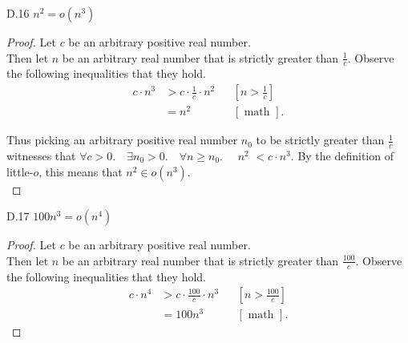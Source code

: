 \documentclass[10pt]{article}
\begin{document}
\begin{enumerate}[label={}]
            \newpage

            D.16 $n^2=o\left(n^3\right)$
            \begin{proof}
                  Let $c$ be an arbitrary positive real number.\\
                  Then let $n$ be an arbitrary real number that is strictly greater than $\frac{1}{c}$. Observe the following inequalities that they hold.\\
                  $$
                        \begin{aligned}
                              c \cdot n^3 & >c \cdot \frac{1}{c} \cdot n^2 &  & {\left[n>\frac{1}{c}\right] } \\
                                          & =n^2                           &  & {[\text { math }]. }
                        \end{aligned}
                  $$

                  Thus picking an arbitrary positive real number $n_0$ to be strictly greater than $\frac{1}{c}$ witnesses that $\forall c>0 . \quad \exists n_0>0 . \quad \forall n \geq n_0 . \quad$ $n^2$ $< c \cdot n^3$. By the definition of little-$o$, this means that $n^2 \in o\left(n^3\right)$.\\
            \end{proof}
            D.17 $100 n^3=o\left(n^4\right)$
            \begin{proof}
                  Let $c$ be an arbitrary positive real number.\\
                  Then let $n$ be an arbitrary real number that is strictly greater than $\frac{100}{c}$. Observe the following inequalities that they hold.\\
                  $$
                        \begin{aligned}
                              c \cdot n^4 & >c \cdot \frac{100}{c} \cdot n^3 &  & {\left[n>\frac{100}{c}\right] } \\
                                          & =100n^3                          &  & {[\text { math }]. }
                        \end{aligned}
                  $$


\end{proof}
\end{enumerate}
\end{document}
